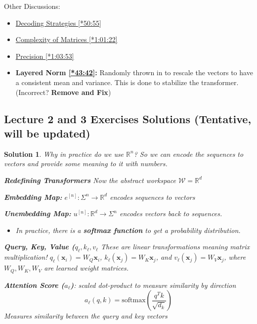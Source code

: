 \documentclass[12pt, twoside]{article}
\theoremstyle{spaceddefn}
\newtheorem{soln}{Solution}[section]
\begin{document}
Other Discussions:
\begin{itemize}
    \item \href{https://youtu.be/1u6h3Nm3NvM?si=DPbOrvmmc-rPRJFs&t=3055}{Decoding Strategies [*50:55]}
    \item \href{https://youtu.be/1u6h3Nm3NvM?si=vG1ilQpx0IZ3sRSs&t=3682}{Complexity of Matrices [*1:01:22]}
    \item \href{https://youtu.be/1u6h3Nm3NvM?si=9r417PXiPrKnlHgQ&t=3833}{Precision [*1:03:53]}
    \item \textbf{Layered Norm \href{https://youtu.be/1u6h3Nm3NvM?si=AD17k53UucXSlnau&t=2622}{[*43:42]}:} Randomly thrown in to rescale the vectors to have a consistent mean and variance. This is done to stabilize the transformer. (Incorrect? \textbf{Remove and Fix})
\end{itemize}


\newpage

\subsection*{Lecture 2 and 3 Exercises Solutions \small (Tentative, will be updated)}

\begin{soln}

Why in practice do we use $\mathbb{R}^n$? So we can encode the sequences to vectors and provide some meaning to it with numbers.

\textbf{Redefining Transformers}
Now the abstract workspace $\mathcal{W}=\mathbb{R}^d$

\textbf{Embedding Map:} $e^{[n]}: \Sigma^n \to \mathbb{R}^d$ encodes sequences to vectors

\textbf{Unembedding Map:} $u^{[n]}: \mathbb{R}^d \to \Sigma^n$ encodes vectors back to sequences.
\begin{itemize}
    \item In practice, there is a \textbf{softmax function} to get a probability distribution.
\end{itemize}

\textbf{Query, Key, Value ($q_\ell, k_\ell, v_\ell$} These are linear transformations meaning matrix multiplication! $q_\ell(\mathbf{x}_i) = W_Q \mathbf{x}_i$, $k_\ell(\mathbf{x}_j) = W_K \mathbf{x}_j$, and $v_\ell(\mathbf{x}_j) = W_V \mathbf{x}_j$, where $W_Q, W_K, W_V$ are learned weight matrices.

\textbf{Attention Score ($a_\ell$)}: scaled dot-product to measure similarity by direction
\[ a_\ell(q,k) = \text{softmax}\left(\frac{q^T k}{\sqrt{d_k}}\right) \]
Measures similarity between the query and key vectors


\end{soln}
\end{document}
